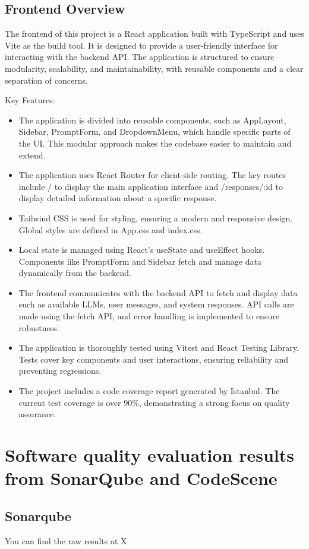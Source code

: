 \documentclass[sigconf]{acmart}
\begin{document}
\subsection{Frontend Overview}
The frontend of this project is a React application built with TypeScript and uses Vite as the build tool. It is designed to provide a user-friendly interface for interacting with the backend API. The application is structured to ensure modularity, scalability, and maintainability, with reusable components and a clear separation of concerns.

Key Features:
\begin{itemize}
\item The application is divided into reusable components, such as AppLayout, Sidebar, PromptForm, and DropdownMenu, which handle specific parts of the UI. This modular approach makes the codebase easier to maintain and extend.
\item The application uses React Router for client-side routing. The key routes include / to display the main application interface and /responses/:id to display detailed information about a specific response.
\item Tailwind CSS is used for styling, ensuring a modern and responsive design. Global styles are defined in App.css and index.css.
\item Local state is managed using React's useState and useEffect hooks. Components like PromptForm and Sidebar fetch and manage data dynamically from the backend.
\item The frontend communicates with the backend API to fetch and display data such as available LLMs, user messages, and system responses. API calls are made using the fetch API, and error handling is implemented to ensure robustness.
\item The application is thoroughly tested using Vitest and React Testing Library. Tests cover key components and user interactions, ensuring reliability and preventing regressions.
\item The project includes a code coverage report generated by Istanbul. The current test coverage is over 90\%, demonstrating a strong focus on quality assurance.
\end{itemize}

\section{Software quality evaluation results from SonarQube and CodeScene}
\subsection{Sonarqube}
You can find the raw results at X
\end{document}
